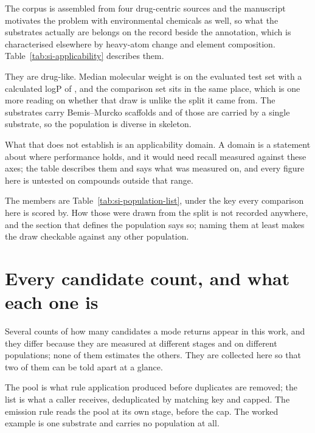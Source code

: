 \documentclass[journal=jcisd8,manuscript=suppinfo,layout=onecolumn]{achemso}
\begin{document}
The corpus is assembled from four drug-centric sources and the manuscript motivates the problem
with environmental chemicals as well, so what the substrates actually are belongs on the record
beside the annotation, which is characterised elsewhere by heavy-atom change and element
composition. Table~\ref{tab:si-applicability} describes them.

They are drug-like. Median molecular weight is \numAdomainEvalMw{} on the evaluated test set with
a calculated logP of \numAdomainEvalLogp{}, and the comparison set sits in the same place, which
is one more reading on whether that draw is unlike the split it came from. The
\numPopulationTestsubs{} substrates carry \numAdomainEvalScaffolds{} Bemis--Murcko scaffolds and
\numAdomainEvalSingletons{} of those are carried by a single substrate, so the population is
diverse in skeleton.

What that does not establish is an applicability domain. A domain is a statement about where
performance holds, and it would need recall measured against these axes; the table describes them
and says what was measured on, and every figure here is untested on compounds outside
that range.



The members are Table~\ref{tab:si-population-list}, under the key every comparison here is
scored by. How those \numPopulationN{} were drawn from the split is not recorded anywhere, and
the section that defines the population says so; naming them at least makes the draw checkable
against any other population.





\section{Every candidate count, and what each one is}
\label{sec:si-counts}

Several counts of how many candidates a mode returns appear in this work, and they differ because
they are measured at different stages and on different populations; none of them estimates the
others. They are collected here so that two of them can be told apart at a glance.



The pool is what rule application produced before duplicates are removed; the list is what a caller
receives, deduplicated by matching key and capped. The emission rule reads the pool at its own
stage, before the cap. The worked example is one substrate and carries no population at all.
\end{document}
